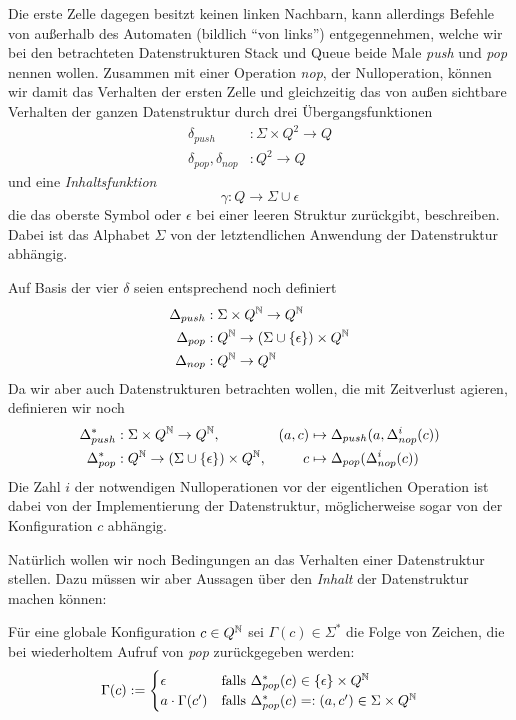 \documentclass{article}
\begin{document}
Die erste Zelle dagegen besitzt keinen linken Nachbarn, kann allerdings Befehle von außerhalb des Automaten (bildlich "`von links"') entgegennehmen, welche wir bei den betrachteten Datenstrukturen Stack und Queue beide Male \emph{push} und \emph{pop} nennen wollen. Zusammen mit einer Operation \emph{nop}, der Nulloperation, können wir damit das Verhalten der ersten Zelle und gleichzeitig das von außen sichtbare Verhalten der ganzen Datenstruktur durch drei Übergangsfunktionen
\begin{align*}
    \delta_{push} &: \Sigma \times Q^2 \rightarrow Q \\
    \delta_{pop}, \delta_{nop} &: Q^2 \rightarrow Q
\end{align*}
und eine \emph{Inhaltsfunktion}
\[ \gamma : Q \rightarrow \Sigma \cup {\epsilon} \]
die das oberste Symbol oder $\epsilon$ bei einer leeren Struktur zurückgibt, beschreiben. Dabei ist das Alphabet $\Sigma$ von der letztendlichen Anwendung der Datenstruktur abhängig.

Auf Basis der vier $\delta$ seien entsprechend noch definiert
\begin{align*}
    \Delta_{push} &: \Sigma \times Q^{\mathbb{N}} \rightarrow Q^{\mathbb{N}} \\
    \Delta_{pop} &: Q^{\mathbb{N}} \rightarrow (\Sigma \cup \{\epsilon\}) \times Q^{\mathbb{N}} \\
    \Delta_{nop} &: Q^{\mathbb{N}} \rightarrow Q^{\mathbb{N}}
\end{align*}
Da wir aber auch Datenstrukturen betrachten wollen, die mit Zeitverlust agieren, definieren wir noch
\begin{align*}
    \Delta^*_{push} &: \Sigma \times Q^{\mathbb{N}} \rightarrow Q^{\mathbb{N}},& (a,c) &\mapsto \Delta_{push}(a,\Delta^i_{nop}(c)) \\
    \Delta^*_{pop} &: Q^{\mathbb{N}} \rightarrow (\Sigma \cup \{\epsilon\}) \times Q^{\mathbb{N}},& c &\mapsto \Delta_{pop}(\Delta^i_{nop}(c))
\end{align*}
Die Zahl $i$ der notwendigen Nulloperationen vor der eigentlichen Operation ist dabei von der Implementierung der Datenstruktur, möglicherweise sogar von der Konfiguration $c$ abhängig.

Natürlich wollen wir noch Bedingungen an das Verhalten einer Datenstruktur stellen. Dazu müssen wir aber Aussagen über den \emph{Inhalt} der Datenstruktur machen können:
\begin{definition}
    Für eine globale Konfiguration $c \in Q^{\mathbb{N}}$ sei $\Gamma(c) \in \Sigma^*$ die Folge von Zeichen, die bei wiederholtem Aufruf von \emph{pop} zurückgegeben werden:
    \[ \Gamma(c) := \begin{cases}
            \epsilon &\text{falls } \Delta^*_{pop}(c) \in \{\epsilon\} \times Q^{\mathbb{N}} \\
        a \cdot \Gamma(c') &\text{falls }\Delta^*_{pop}(c)=:(a,c') \in \Sigma \times Q^{\mathbb{N}}
    \end{cases} \]
\end{definition}
\end{document}
